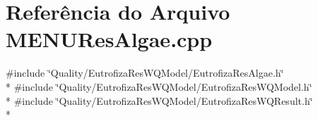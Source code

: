 \section{Referência do Arquivo M\+E\+N\+U\+Res\+Algae.\+cpp}
\label{_m_e_n_u_res_algae_8cpp}
{\ttfamily \#include \char`\"{}Quality/\+Eutrofiza\+Res\+W\+Q\+Model/\+Eutrofiza\+Res\+Algae.\+h\char`\"{}}\\*
{\ttfamily \#include \char`\"{}Quality/\+Eutrofiza\+Res\+W\+Q\+Model/\+Eutrofiza\+Res\+W\+Q\+Model.\+h\char`\"{}}\\*
{\ttfamily \#include \char`\"{}Quality/\+Eutrofiza\+Res\+W\+Q\+Model/\+Eutrofiza\+Res\+W\+Q\+Result.\+h\char`\"{}}\\*
